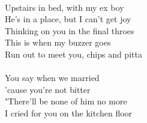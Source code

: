 \\
Upstairs in bed, with my ex boy \\
He's in a place, but I can't get joy \\
Thinking on you in the final throes \\
This is when my buzzer goes \\
Run out to meet you, chips and pitta \\
\\
You say when we married \\
'cause you're not bitter \\
"There'll be none of him no more \\
I cried for you on the kitchen floor \\
